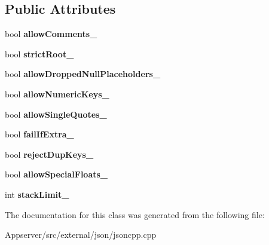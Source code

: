 \subsection*{Public Attributes}
\begin{DoxyCompactItemize}
\item 
bool {\bfseries allow\+Comments\+\_\+}\hypertarget{classJson_1_1OurFeatures_ac71bb7ba7363d3b05ed76602b036ce33}{}\label{classJson_1_1OurFeatures_ac71bb7ba7363d3b05ed76602b036ce33}

\item 
bool {\bfseries strict\+Root\+\_\+}\hypertarget{classJson_1_1OurFeatures_a2095f66a776c0a4ae6cc931a0c94242e}{}\label{classJson_1_1OurFeatures_a2095f66a776c0a4ae6cc931a0c94242e}

\item 
bool {\bfseries allow\+Dropped\+Null\+Placeholders\+\_\+}\hypertarget{classJson_1_1OurFeatures_a13963bc44bf948eec1968f7ff8e8f5f1}{}\label{classJson_1_1OurFeatures_a13963bc44bf948eec1968f7ff8e8f5f1}

\item 
bool {\bfseries allow\+Numeric\+Keys\+\_\+}\hypertarget{classJson_1_1OurFeatures_af6973fc7e774ce2d634ba99442aeb91a}{}\label{classJson_1_1OurFeatures_af6973fc7e774ce2d634ba99442aeb91a}

\item 
bool {\bfseries allow\+Single\+Quotes\+\_\+}\hypertarget{classJson_1_1OurFeatures_abbd6c196d7a22e2a360a59887eda4610}{}\label{classJson_1_1OurFeatures_abbd6c196d7a22e2a360a59887eda4610}

\item 
bool {\bfseries fail\+If\+Extra\+\_\+}\hypertarget{classJson_1_1OurFeatures_ae8ad25b90706c78f1a8fe929191ac61b}{}\label{classJson_1_1OurFeatures_ae8ad25b90706c78f1a8fe929191ac61b}

\item 
bool {\bfseries reject\+Dup\+Keys\+\_\+}\hypertarget{classJson_1_1OurFeatures_a39b8e0b86b1c24a45e800c023bb715aa}{}\label{classJson_1_1OurFeatures_a39b8e0b86b1c24a45e800c023bb715aa}

\item 
bool {\bfseries allow\+Special\+Floats\+\_\+}\hypertarget{classJson_1_1OurFeatures_af760f91cc2a7af37e44f78fb466061bb}{}\label{classJson_1_1OurFeatures_af760f91cc2a7af37e44f78fb466061bb}

\item 
int {\bfseries stack\+Limit\+\_\+}\hypertarget{classJson_1_1OurFeatures_a9a786713902d14be6d57a08cc03ccfff}{}\label{classJson_1_1OurFeatures_a9a786713902d14be6d57a08cc03ccfff}

\end{DoxyCompactItemize}


The documentation for this class was generated from the following file\+:\begin{DoxyCompactItemize}
\item 
Appserver/src/external/json/jsoncpp.\+cpp\end{DoxyCompactItemize}
